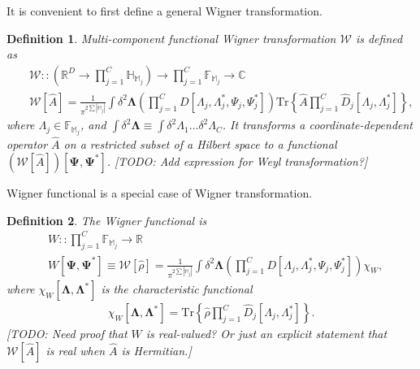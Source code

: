 \documentclass[12pt,aip,jmp,amssymb,amsmath]{revtex4-1}
\newtheorem{definition}{Definition}
\begin{document}
It is convenient to first define a general Wigner transformation.

\begin{definition}
\label{def:func-wigner:w-transformation}
    Multi-component functional Wigner transformation $\mathcal{W}$ is defined as
    \begin{eqnarray*}
    & &   \mathcal{W} :: \left( \mathbb{R}^D \rightarrow \prod_{j=1}^C \mathbb{H}_{\mathbb{M}_j} \right)
            \rightarrow \prod_{j=1}^C \mathbb{F}_{\mathbb{M}_j}
            \rightarrow \mathbb{C} \\
    & &   \mathcal{W}[\hat{A}]
        = \frac{1}{\pi^{2 \sum|\mathbb{M}_j|}} \int \delta^2 \boldsymbol{\Lambda}
            \left( \prod_{j=1}^C D[\Lambda_j, \Lambda_j^*, \Psi_j, \Psi_j^*] \right)
            \mathrm{Tr} \left\{ \hat{A} \prod_{j=1}^C \hat{D}_j[\Lambda_j, \Lambda_j^*] \right\},
    \end{eqnarray*}
    where $\Lambda_j \in \mathbb{F}_{\mathbb{M}_j}$, and $\int \delta^2 \boldsymbol{\Lambda} \equiv \int \delta^2 \Lambda_1 \ldots \delta^2 \Lambda_C$.
    It transforms a coordinate-dependent operator $\hat{A}$ on a restricted subset of a Hilbert space to a functional $(\mathcal{W}[\hat{A}])[\boldsymbol{\Psi}, \boldsymbol{\Psi}^*]$.
    [TODO: Add expression for Weyl transformation?]
\end{definition}

Wigner functional is a special case of Wigner transformation.

\begin{definition}
\label{def:func-wigner:w-functional}
    The Wigner functional is
    \begin{eqnarray*}
    &    W :: \prod_{j=1}^C \mathbb{F}_{\mathbb{M}_j} \rightarrow \mathbb{R} \\
    &    W [\boldsymbol{\Psi}, \boldsymbol{\Psi}^*]
        \equiv \mathcal{W}[\hat{\rho}]
        = \frac{1}{\pi^{2 \sum|\mathbb{M}_j|}} \int \delta^2 \boldsymbol{\Lambda}
            \left( \prod_{j=1}^C D[\Lambda_j, \Lambda_j^*, \Psi_j, \Psi_j^*] \right) \chi_W,
    \end{eqnarray*}
    where $\chi_W [\boldsymbol{\Lambda}, \boldsymbol{\Lambda}^*]$ is the characteristic functional
    \begin{eqnarray*}
        \chi_W [\boldsymbol{\Lambda}, \boldsymbol{\Lambda}^*]
        = \mathrm{Tr} \left\{ \hat{\rho} \prod_{j=1}^C \hat{D}_j[\Lambda_j, \Lambda_j^*] \right\}.
    \end{eqnarray*}
    [TODO: Need proof that $W$ is real-valued?
    Or just an explicit statement that $\mathcal{W}[\hat{A}]$ is real when $\hat{A}$ is Hermitian.]
\end{definition}
\end{document}
